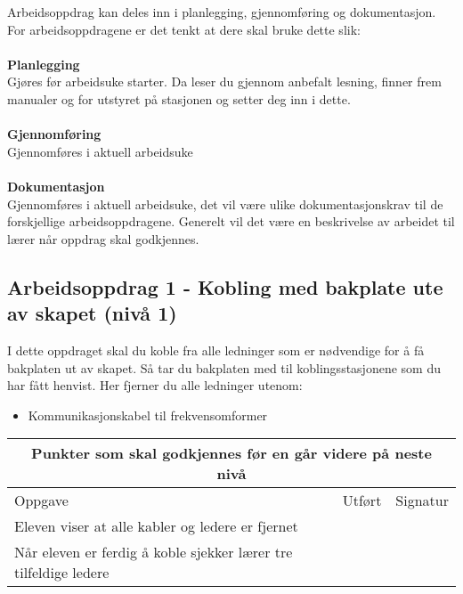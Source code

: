 Arbeidsoppdrag kan deles inn i planlegging, gjennomføring og dokumentasjon.\\
For arbeidsoppdragene er det tenkt at dere skal bruke dette slik:\\\\
\textbf{Planlegging}\\
Gjøres før arbeidsuke starter. Da leser du gjennom anbefalt lesning, finner frem manualer og for  utstyret på stasjonen og setter deg inn i dette.\\ \\
\textbf{Gjennomføring}\\
Gjennomføres i aktuell arbeidsuke\\\\

\textbf{Dokumentasjon}\\
Gjennomføres i aktuell arbeidsuke, det vil være ulike dokumentasjonskrav til de forskjellige arbeidsoppdragene. Generelt vil det være en beskrivelse av arbeidet til lærer når oppdrag skal godkjennes. \\


\newpage

\subsection*{Arbeidsoppdrag 1 -  Kobling med bakplate ute av skapet (nivå 1)}

I dette oppdraget skal du koble fra alle ledninger som er nødvendige for å få bakplaten ut av skapet. Så tar du bakplaten med til koblingsstasjonene som du har fått henvist. Her fjerner du alle ledninger utenom:
\begin{itemize}[noitemsep]
	\item Kommunikasjonskabel til frekvensomformer
\end{itemize}


\vskip 5pt 
\begin{center} \begin{tabular}{ | m{8cm} | m{1cm}| m{2cm} | } 
\hline
\multicolumn{3}{|c|}{Punkter som skal godkjennes før en går videre på neste nivå} \\
	\hline
	Oppgave	& Utført & Signatur \\ 
	\hline
Eleven viser at alle kabler og ledere er fjernet& & \\ 
	\hline
Når eleven er ferdig å koble sjekker lærer tre tilfeldige ledere& & \\ 
	\hline
\end{tabular}
\end{center}

